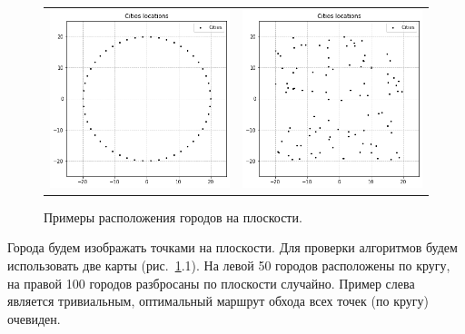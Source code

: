 \documentclass[12pt, a4paper]{article}
\begin{document}
    \begin{figure}[h!]
        \center
        \begin{tabular}{cc}
            \includegraphics[width = 6cm]{dots1_1.png} &
            \includegraphics[width = 6cm]{dots2_1.png} \\
        \end{tabular}
        \label{image21}
        \caption{Примеры расположения городов на плоскости.}
    \end{figure}
    
    Города будем изображать точками на плоскости. Для проверки алгоритмов 
    будем использовать две карты (рис.~\ref{image21}.1). На левой 50 городов 
    расположены по кругу, на правой 100 городов разбросаны по плоскости 
    случайно. Пример слева является тривиальным, оптимальный маршрут обхода 
    всех точек (по кругу) очевиден.
    
\end{document}
